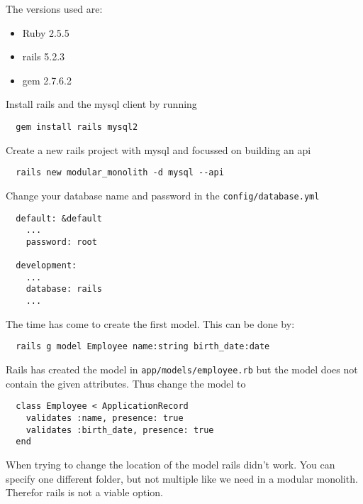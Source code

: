 The versions used are:
\begin{itemize}
  \item Ruby 2.5.5
  \item rails 5.2.3
  \item gem 2.7.6.2
\end{itemize}

Install rails and the mysql client by running
\begin{verbatim}
  gem install rails mysql2
\end{verbatim}

Create a new rails project with mysql and focussed on building an api
\begin{verbatim}
  rails new modular_monolith -d mysql --api
\end{verbatim}

Change your database name and password in the \texttt{config/database.yml}
\begin{verbatim}
  default: &default
    ...
    password: root

  development:
    ...
    database: rails
    ...
\end{verbatim}

The time has come to create the first model. This can be done by:
\begin{verbatim}
  rails g model Employee name:string birth_date:date
\end{verbatim}

Rails has created the model in \texttt{app/models/employee.rb} but the model does not contain the given attributes. Thus change the model to
\begin{verbatim}
  class Employee < ApplicationRecord
    validates :name, presence: true
    validates :birth_date, presence: true
  end
\end{verbatim}

When trying to change the location of the model rails didn't work. You can specify one different folder, but not multiple like we need in a modular monolith. Therefor rails is not a viable option.
